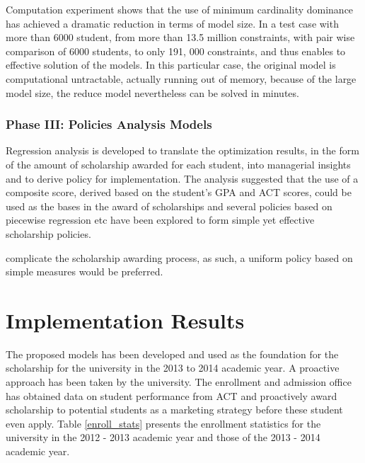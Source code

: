 \documentclass[12pt,english]{report}
\begin{document}
Computation experiment shows that the use of minimum cardinality dominance has
achieved a dramatic reduction in terms of model size. In a test case with more
than 6000 student,  from more than 13.5 million constraints, with pair wise
comparison of 6000 students, to only 191, 000 constraints, and thus enables to
effective solution of the models.   In this particular case,  the original
model is computational untractable, actually running out of memory, because of
the large model size,  the reduce model nevertheless can be solved in minutes.

\subsubsection{Phase III: Policies Analysis Models}
Regression analysis is developed to translate the optimization results, in the
form of the  amount of scholarship awarded for each student, into managerial
insights and to derive policy for implementation.  The analysis suggested that
the use of a composite score, derived based on the student's GPA and ACT
scores, could be used as the bases in the award of scholarships and several
policies based on piecewise regression etc have been explored to form simple
yet effective scholarship policies.

complicate the scholarship awarding process, as such, a uniform policy based on
simple measures would be preferred.

\section{Implementation Results}
The proposed models has been developed and used as the foundation for the
scholarship for the university in the 2013 to 2014 academic year.  A proactive
approach has been taken by the university. The enrollment and admission office
has obtained data on student performance from ACT and  proactively award
scholarship to potential students as a marketing strategy before these student
even apply. Table \ref{enroll_stats} presents the enrollment statistics for the
university in the 2012 - 2013 academic year and those of the 2013 - 2014
academic year.
\end{document}
